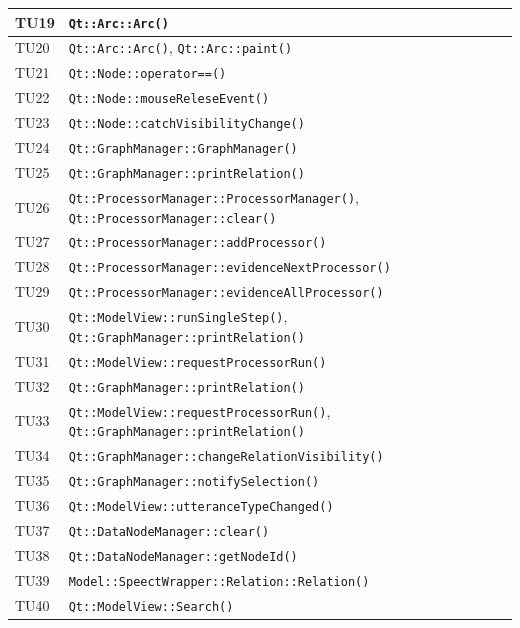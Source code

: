 \documentclass[openany,12pt,a4paper]{report}
\begin{document}
\begin{longtable}[c]{| p{2.5cm} |p{11.5cm}|}
	\\[1em]
	\hline
	TU19&
	\verb|Qt::Arc::Arc()|
	\\[1em]
	\hline
	TU20&
	\verb|Qt::Arc::Arc()|,
	\verb|Qt::Arc::paint()|
	\\[1em]
	\hline
	TU21&
	\verb|Qt::Node::operator==()|
	\\[1em]
	\hline
	TU22&
	\verb|Qt::Node::mouseReleseEvent()|
	\\[1em]
	\hline
	TU23&
	\verb|Qt::Node::catchVisibilityChange()|
	\\[1em]
	\hline
	TU24&
	\verb|Qt::GraphManager::GraphManager()|
	\\[1em]
	\hline
	TU25&
	\verb|Qt::GraphManager::printRelation()|
	\\[1em]
	\hline
	TU26&
	\verb|Qt::ProcessorManager::ProcessorManager()|,
	\verb|Qt::ProcessorManager::clear()|
	\\[1em]
	\hline
	TU27&
	\verb|Qt::ProcessorManager::addProcessor()|
	\\[1em]
	\hline
	TU28&
	\verb|Qt::ProcessorManager::evidenceNextProcessor()|
	\\[1em]
	\hline
	TU29&
	\verb|Qt::ProcessorManager::evidenceAllProcessor()|
	\\[1em]
	\hline
	TU30&
	\verb|Qt::ModelView::runSingleStep()|,
	\verb|Qt::GraphManager::printRelation()|
	\\[1em]
	\hline
	TU31&
	\verb|Qt::ModelView::requestProcessorRun()|
	\\[1em]
	\hline
	TU32&
	\verb|Qt::GraphManager::printRelation()|
	\\[1em]
	\hline
	TU33&
	\verb|Qt::ModelView::requestProcessorRun()|,
	\verb|Qt::GraphManager::printRelation()|
	\\[1em]
	\hline
	TU34&
	\verb|Qt::GraphManager::changeRelationVisibility()|
	\\[1em]
	\hline
	TU35&
	\verb|Qt::GraphManager::notifySelection()|
	\\[1em]
	\hline
	TU36&
	\verb|Qt::ModelView::utteranceTypeChanged()|
	\\[1em]
	\hline
	TU37&
	\verb|Qt::DataNodeManager::clear()|
	\\[1em]
	\hline
	TU38&
	\verb|Qt::DataNodeManager::getNodeId()|
	\\[1em]
	\hline
	TU39&
	\verb|Model::SpeectWrapper::Relation::Relation()|
	\\[1em]
	\hline
	TU40&
	\verb|Qt::ModelView::Search()|
	\\[1em]
	\hline
\end{longtable}
\end{document}
